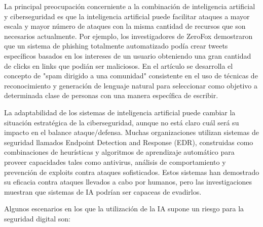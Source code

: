 \documentclass[12pt,a4paper]{article}
\begin{document}
La principal preocupación concerniente a la combinación de inteligencia artificial y ciberseguridad es que la inteligencia artificial puede facilitar ataques a mayor escala y mayor número de ataques con la misma cantidad de recursos que son necesarios actualmente.  Por ejemplo, los investigadores de ZeroFox demostraron que un sistema de phishing totalmente automatizado podía crear tweets específicos basados en los intereses de un usuario obteniendo una gran cantidad de clicks en links que podián ser maliciosos. En el artículo \cite{TargetedPhishing} se desarrolla el concepto de "spam dirigido a una comunidad" consistente en el uso de técnicas de reconocimiento y generación de lenguaje natural para seleccionar como objetivo a determinada clase de personas con una manera específica de escribir.

La adaptabilidad de los sistemas de inteligencia artificial puede cambiar la situación estratégica de la ciberseguridad, aunque no está claro cuál será su impacto en el balance ataque/defensa. Muchas organizaciones utilizan sistemas de seguridad llamados Endpoint Detection and Response (EDR), construidas como combinaciones de heurísticas y algoritmos de aprendizaje automático para proveer capacidades tales como antivirus, análisis de comportamiento y prevención de exploits contra ataques sofisticados. Estos sistemas han demostrado su eficacia contra ataques llevados a cabo por humanos, pero las investigaciones muestran que sistemas de IA podrían ser capaceas de evadirlos.

Algunos escenarios en los que la utilización de la IA supone un riesgo para la seguridad digital son:
\end{document}
